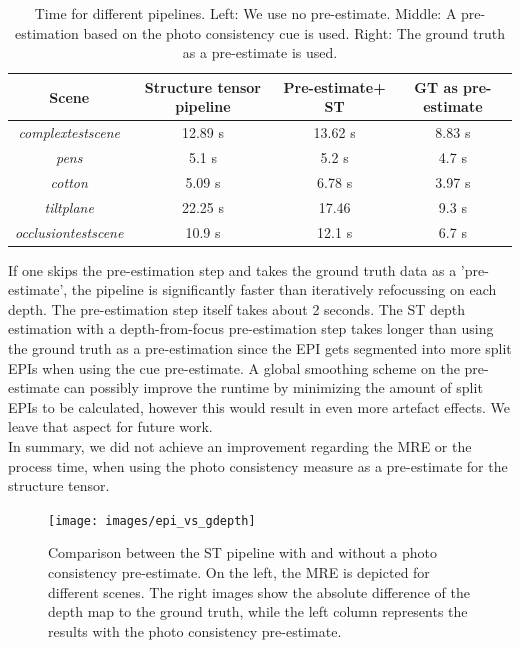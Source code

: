 \documentclass  [
  paper    = a4,
  BCOR     = 10mm,
  twoside,
  fontsize = 12pt,
  fleqn,
  toc      = bibnumbered,
  toc      = listofnumbered,
  numbers  = noendperiod,
  headings = normal,
  listof   = leveldown,
  version  = 3.03
]                                       {scrreprt}
\begin{document}
 		\begin{table}[h!]\label{tab:time_gdepth}
 		\begin{tabular}{|c|c|c|c|}
 			\hline 
 			Scene & Structure tensor pipeline & Pre-estimate+ ST & GT as pre-estimate \\ 
 			\hline 
 			\textit{complextestscene} & 12.89 s & 13.62 s & 8.83 s \\ 
 			\hline 
 			\textit{pens} & 5.1 s & 5.2 s & 4.7 s \\ 
 			\hline 
 			\textit{cotton} & 5.09 s & 6.78 s & 3.97 s \\ 
 			\hline 
 			\textit{tiltplane} & 22.25 s & 17.46 &  9.3 s \\ 
 			\hline 
 			\textit{occlusiontestscene} & 10.9 s & 12.1 s & 6.7 s \\ 
 			\hline 	
 		\end{tabular} 
 		\caption[Depth-from-focus: Time for pipelines]{Time for different pipelines. Left: We use no pre-estimate. Middle: A pre-estimation based on the photo consistency cue is used. Right: The ground truth as a pre-estimate is used.}
 	\end{table}
 	If one skips the pre-estimation step and takes the ground truth data as a 'pre-estimate', the pipeline is significantly faster than iteratively refocussing on each depth. The pre-estimation step itself takes about 2 seconds. The ST depth estimation with a depth-from-focus pre-estimation step takes longer than using the ground truth as a pre-estimation since the EPI gets segmented into more split EPIs when using the cue pre-estimate. A global smoothing scheme on the pre-estimate can possibly improve the runtime by minimizing the amount of split EPIs to be calculated, however this would result in even more artefact effects. We leave that aspect for future work.\\ In summary, we did not achieve an improvement regarding the MRE or the process time, when using the photo consistency measure as a pre-estimate for the structure tensor. 
 	\begin{figure}[h!]
 		\centering
 		\texttt{[image: images/epi\_vs\_gdepth]}
 		\caption[Photo-consistency pre-estimate for the structure tensor]{Comparison between the ST pipeline with and without a photo consistency pre-estimate. On the left, the MRE is depicted for different scenes. The right images show the absolute difference of the depth map to the ground truth, while the left column represents the results with the photo consistency pre-estimate.}
 		\label{fig:epivsgdepth}
 	\end{figure}
\goodbreak
\end{document}
